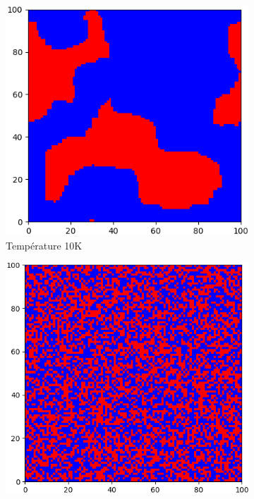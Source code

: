 \documentclass{article}
\begin{document}
\begin{figure}[htbp]
  \centering
  \begin{subfigure}[b]{0.22\textwidth}
    \centering
    \includegraphics[width=\textwidth]{DW/Grille_cut_10K_V2.png}
    \caption{Température 10K}
    \label{2D_10K}
  \end{subfigure}\hfill
  \begin{subfigure}[b]{0.22\textwidth}
    \centering
    \includegraphics[width=\textwidth]{DW/Grille_cut_500K_V2.png}

\end{subfigure}
\end{figure}
\end{document}
